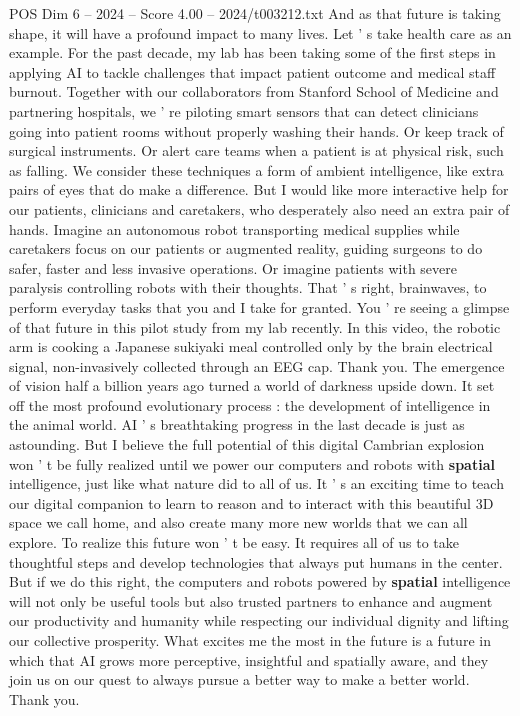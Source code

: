 \begin{textsample}{POS Dim 6 – 2024 – Score 4.00 – 2024/t003212.txt}
And as that future is taking shape, it will have a profound impact to many lives.
Let ' s take health care as an example.
For the past decade, my lab has been taking some of the first steps in applying AI to tackle challenges that impact patient outcome and medical staff burnout.
Together with our collaborators from Stanford School of Medicine and partnering hospitals, we ' re piloting smart sensors that can detect clinicians going into patient rooms without properly washing their hands.
Or keep track of surgical instruments.
Or alert care teams when a patient is at physical risk, such as falling.
We consider these techniques a form of ambient intelligence, like extra pairs of eyes that do make a difference.
But I would like more interactive help for our patients, clinicians and caretakers, who desperately also need an extra pair of hands.
Imagine an autonomous robot transporting medical supplies while caretakers focus on our patients or augmented reality, guiding surgeons to do safer, faster and less invasive operations.
Or imagine patients with severe paralysis controlling robots with their thoughts.
That ' s right, brainwaves, to perform everyday tasks that you and I take for granted.
You ' re seeing a glimpse of that future in this pilot study from my lab recently.
In this video, the robotic arm is cooking a Japanese sukiyaki meal controlled only by the brain electrical signal, non-invasively collected through an EEG cap.
Thank you.
The emergence of vision half a billion years ago turned a world of darkness upside down.
It set off the most profound evolutionary process : the development of intelligence in the animal world.
AI ' s breathtaking progress in the last decade is just as astounding.
But I believe the full potential of this digital Cambrian explosion won ' t be fully realized until we power our computers and robots with \textbf{spatial} intelligence, just like what nature did to all of us.
It ' s an exciting time to teach our digital companion to learn to reason and to interact with this beautiful 3D space we call home, and also create many more new worlds that we can all explore.
To realize this future won ' t be easy.
It requires all of us to take thoughtful steps and develop technologies that always put humans in the center.
But if we do this right, the computers and robots powered by \textbf{spatial} intelligence will not only be useful tools but also trusted partners to enhance and augment our productivity and humanity while respecting our individual dignity and lifting our collective prosperity.
What excites me the most in the future is a future in which that AI grows more perceptive, insightful and spatially aware, and they join us on our quest to always pursue a better way to make a better world.
Thank you.

\end{textsample}
